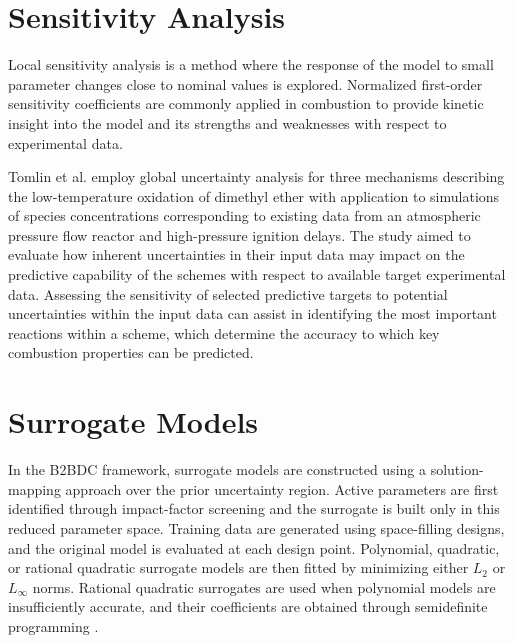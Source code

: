 \section{Sensitivity Analysis}
Local sensitivity analysis is a method where the response of the model to small parameter changes close to nominal values is explored. Normalized first-order sensitivity coefficients are commonly applied in combustion to provide kinetic insight into the model and its strengths and weaknesses with respect to experimental data.\cite{tomlin_role_2013}



Tomlin et al. \cite{tomlin_evaluation_2014} employ global uncertainty analysis for three mechanisms describing the low-temperature oxidation of dimethyl ether with application to simulations of species concentrations corresponding to existing data from an atmospheric pressure flow reactor and high-pressure ignition delays. The study aimed to evaluate how inherent uncertainties in their input data may impact on the predictive capability of the schemes with respect to available target experimental data. Assessing the sensitivity of selected predictive targets to potential uncertainties within the input data can assist in identifying the most important reactions within a scheme, which determine the accuracy to which key combustion properties can be predicted. 


\section{Surrogate Models}
In the B2BDC framework, surrogate models are constructed using a solution-mapping approach over the prior uncertainty region. Active parameters are first identified through impact-factor screening and the surrogate is built only in this reduced parameter space. Training data are generated using space-filling designs, and the original model is evaluated at each design point. Polynomial, quadratic, or rational quadratic surrogate models are then fitted by minimizing either $L_2$ or $L_\infty$ norms. Rational quadratic surrogates are used when polynomial models are insufficiently accurate, and their coefficients are obtained through semidefinite programming \cite{li_development_nodate}.

